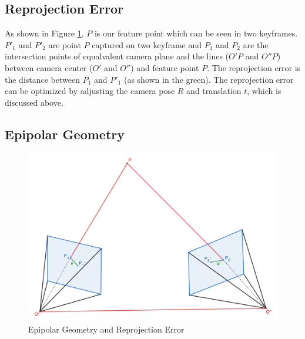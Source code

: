 \subsection{Reprojection Error}
As shown in Figure \ref{epi}, $P$ is our feature point which can be seen in two keyframes. $P'_1$ and $P'_2$ are point $P$ captured on two keyframe and $P_1$ and $P_2$ are the intersection points of equalvalent camera plane and the lines ($O'P$ and $O''P$) between camera center ($O'$ and $O''$) and feature point $P$. The reprojection error is the distance between $P_1$ and $P'_1$ (as shown in the green). The reprojection error can be optimized by adjusting the camera pose $R$ and translation $t$, which is discussed above.

\subsection{Epipolar Geometry}
\begin{figure}
    \centering
    \includegraphics[scale=1.15]{Epipolar.png}
    \caption{Epipolar Geometry and Reprojection Error}
    \label{epi}
\end{figure}

